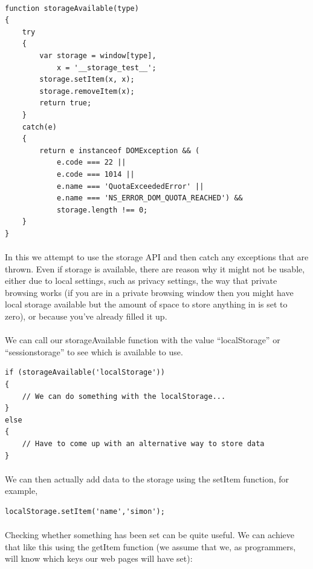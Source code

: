 \documentclass[10pt, a4paper, twosize]{article}
\begin{document}
\paragraph{} 

\begin{lstlisting}
function storageAvailable(type)
{
    try
    {
        var storage = window[type],
            x = '__storage_test__';
        storage.setItem(x, x);
        storage.removeItem(x);
        return true;
    }
    catch(e)
    {
        return e instanceof DOMException && (
            e.code === 22 ||
            e.code === 1014 ||
            e.name === 'QuotaExceededError' ||
            e.name === 'NS_ERROR_DOM_QUOTA_REACHED') &&
            storage.length !== 0;
    }
}
\end{lstlisting}
\paragraph{} In this we attempt to use the storage API and then catch any exceptions that are thrown. Even if storage is available, there are reason why it might not be usable, either due to local settings, such as privacy settings, the way that private browsing works (if you are in a private browsing window then you might have local storage available but the amount of space to store anything in is set to zero), or because you've already filled it up.

\paragraph{} We can call our storageAvailable function with the value ``localStorage'' or ``sessionstorage'' to see which is available to use.
\begin{lstlisting}
if (storageAvailable('localStorage'))
{
    // We can do something with the localStorage...
}
else 
{
    // Have to come up with an alternative way to store data
}
\end{lstlisting}

\paragraph{} We can then actually add data to the storage using the setItem function, for example,
\begin{lstlisting}
localStorage.setItem('name','simon');
\end{lstlisting}
\paragraph{} Checking whether something has been set can be quite useful. We can achieve that like this using the getItem function (we assume that we, as programmers, will know which keys our web pages will have set):
\end{document}
